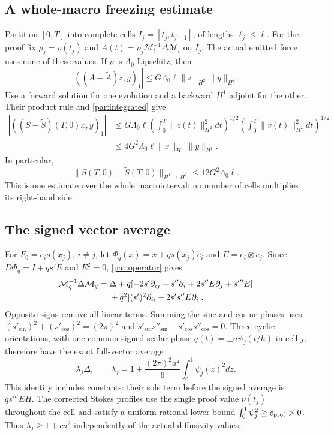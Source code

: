 \documentclass[11pt,a4paper]{amsart}
\theoremstyle{definition}
\theoremstyle{remark}
\numberwithin{equation}{section}
\begin{document}
\subsection{A whole-macro freezing estimate}

Partition $[0,T]$ into complete cells $I_j=[t_j,t_{j+1}]$, of lengths
$\ell_j\le\ell$. For the proof fix
$\rho_j=\rho(t_j)$ and
$\widetilde A(t)=\rho_j\mathcal M_t^{-1}\Delta\mathcal M_t$ on $I_j$.
The actual emitted force uses none of these values. If $\rho$ is
$\Lambda_0$-Lipschitz, then
\begin{equation}\label{par:freezform}
 |((A-\widetilde A)z,y)_1|
 \le G\Lambda_0\ell\|z\|_{H^2}\|y\|_{H^2}.
\end{equation}
Use a forward solution for one evolution and a backward $H^1$ adjoint for
the other. Their product rule and \eqref{par:integrated} give
\begin{align*}
 |((S-\widetilde S)(T,0)x,y)_1|
 &\le G\Lambda_0\ell
 \left(\int_0^T\|z(t)\|_{H^2}^2dt\right)^{1/2}
 \left(\int_0^T\|v(t)\|_{H^2}^2dt\right)^{1/2}\\
 &\le4G^2\Lambda_0\ell\|x\|_{H^1}\|y\|_{H^1}.
\end{align*}
In particular,
\begin{equation}\label{par:freezing}
 \|S(T,0)-\widetilde S(T,0)\|_{H^1\to H^1}
 \le12G^2\Lambda_0\ell.
\end{equation}
This is one estimate over the whole macrointerval; no number of cells
multiplies its right-hand side.

\subsection{The signed vector average}

For $F_0=e_i s(x_j)$, $i\ne j$, let
$\Phi_q(x)=x+qs(x_j)e_i$ and $E=e_i\otimes e_j$. Since
$D\Phi_q=I+qs'E$ and $E^2=0$, \eqref{par:operator} gives
\begin{align}
 \mathcal M_q^{-1}\Delta\mathcal M_q
 ={}&\Delta+q[-2s'\partial_{ij}-s''\partial_i
                    +2s''E\partial_j+s'''E]\notag\\
 &+q^2[(s')^2\partial_{ii}-2s's''E\partial_i].
 \label{par:shearformula}
\end{align}
Opposite signs remove all linear terms. Summing the sine and cosine phases
uses $(s'_{\sin})^2+(s'_{\cos})^2=(2\pi)^2$ and
$s'_{\sin}s''_{\sin}+s'_{\cos}s''_{\cos}=0$. Three cyclic orientations,
with one common signed scalar phase $q(t)=\pm a\psi_j(t/h)$ in cell $j$,
therefore have the exact full-vector average
\begin{equation}\label{par:scalaraverage}
 \lambda_j\Delta,\qquad
 \lambda_j=1+\frac{(2\pi)^2a^2}{6}\int_0^1\psi_j(z)^2dz.
\end{equation}
This identity includes constants: their sole term before the signed average
is $qs'''EH$. The corrected Stokes profiles use the single proof value
$\nu(t_j)$ throughout the cell and satisfy a uniform rational lower bound
$\int_0^1\psi_j^2\ge c_{\rm prof}>0$. Thus
$\lambda_j\ge1+c a^2$ independently of the actual diffusivity values.
\end{document}
